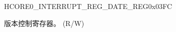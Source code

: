 \begin{register}{H}{CORE0\_INTERRUPT\_REG\_DATE\_REG}{0x03FC}\label{regdesc:CORE0INTERRUPTREGDATEREG}
%
%
\regnewline%
\begin{regdesc}\begin{reglist}
\label{fielddesc:CORE0INTERRUPTREGDATE}\item [CORE0\_INTERRUPT\_REG\_DATE] 版本控制寄存器。 (R/W)
\end{reglist}\end{regdesc}
\end{register}

